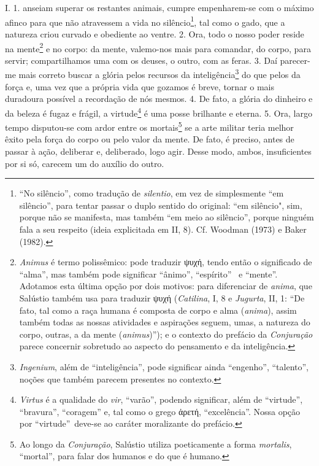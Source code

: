 \part{\titulo}


\chapter*{}

\hedramarkboth{\autor}{}

I. 1.  anseiam superar os restantes animais, cumpre
empenharem-se com o máximo afinco para que não atravessem a vida no
silêncio\footnote{``No silêncio'', como tradução de \emph{silentio}, em vez de
simplesmente ``em silêncio'', para tentar passar o duplo sentido do original:
``em silêncio", sim, porque não se manifesta, mas também ``em meio ao
silêncio'', porque ninguém fala a seu respeito (ideia explicitada em II, 8).
Cf. Woodman (1973) e Baker (1982).}, tal como o gado, que a natureza criou
curvado e obediente ao ventre. 2. Ora, todo o nosso poder reside na
mente\footnote{\emph{Animus} é termo polissêmico: pode traduzir 
\grego ψυχή, tendo então o significado de ``alma'', mas
também pode significar ``ânimo'', ``espírito'' \ e ``mente''. Adotamos esta
última opção por dois motivos: para diferenciar de  \emph{anima}, que Salústio
também usa para traduzir \grego ψυχή (\emph{Catilina},
I, 8 e \emph{Jugurta}, II, 1: ``De fato, tal como a raça humana é composta de
corpo e alma (\emph{anima}), assim também todas as nossas atividades e
aspirações seguem, umas, a natureza do corpo, outras, a da mente
(\emph{animus})''); e o contexto do prefácio da \emph{Conjuração} parece
concernir sobretudo ao aspecto do pensamento e da inteligência.} 
e no corpo: da mente, valemo-nos mais para comandar, do corpo, para servir; compartilhamos uma com
os deuses, o outro, com as feras. 3. Daí parecer-me mais correto buscar a
glória pelos recursos da inteligência\footnote{\emph{Ingenium}, além de
``inteligência'', pode  significar ainda ``engenho'', ``talento'', noções que
também parecem presentes no contexto.} do que pelos da força e, uma vez que a
própria vida que gozamos é breve, tornar o mais duradoura possível a recordação
de nós mesmos. 4. De fato, a glória do dinheiro e da beleza é fugaz e frágil, a
virtude\footnote{\emph{Virtus} é a qualidade do \emph{vir}, ``varão'', podendo
significar, além de ``virtude'', ``bravura'', ``coragem'' e, tal como o grego
\grego ἀρετή, ``excelência''. Nossa opção por
``virtude''\ deve-se ao caráter moralizante do prefácio.} é uma posse brilhante
e eterna. 5. Ora, largo tempo disputou-se com ardor entre os
mortais\footnote{Ao longo da \emph{Conjuração}, Salústio utiliza poeticamente a
forma \emph{mortalis}, ``mortal'', para falar dos humanos e do que é humano.}
se a arte militar teria melhor êxito pela força do corpo ou pelo valor da
mente. De fato, é preciso, antes de passar à ação, deliberar e, deliberado,
logo agir. Desse modo, ambos, insuficientes por si só, carecem um do auxílio do
outro.

